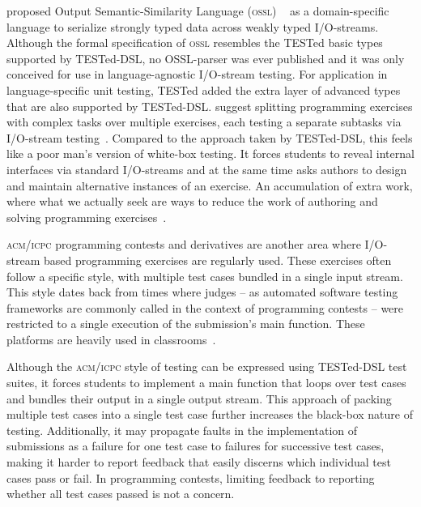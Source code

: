 \documentclass[../main]{subfiles}
\begin{document}
 proposed Output Semantic-Similarity Language (\textsc{ossl}) ~\autocite{fonteFlexibleDynamicSystem2013} as a domain-specific language to serialize strongly typed data across weakly typed I/O-streams.
Although the formal specification of \textsc{ossl} resembles the TESTed basic types supported by TESTed-DSL, no OSSL-parser was ever published and it was only conceived for use in language-agnostic I/O-stream testing.
For application in language-specific unit testing, TESTed added the extra layer of advanced types that are also supported by TESTed-DSL\@.
 suggest splitting programming exercises with complex tasks over multiple exercises, each testing a separate subtasks via I/O-stream testing~\autocite{enstromFiveYearsKattis2011}.
Compared to the approach taken by TESTed-DSL, this feels like a poor man's version of white-box testing.
It forces students to reveal internal interfaces via standard I/O-streams and at the same time asks authors to design and maintain alternative instances of an exercise.
An accumulation of extra work, where what we actually seek are ways to reduce the work of authoring and solving programming exercises~\autocite{douceAutomaticTestbasedAssessment2005}.

\textsc{acm/icpc} programming contests and derivatives are another area where I/O-stream based programming exercises are regularly used.
These exercises often follow a specific style, with multiple test cases bundled in a single input stream.
This style dates back from times where judges -- as automated software testing frameworks are commonly called in the context of programming contests -- were restricted to a single execution of the submission's main function.
These platforms are heavily used in classrooms~\autocite{wasikSurveyOnlineJudge2018,zinovievaUseOnlineCoding2021}.

Although the \textsc{acm/icpc} style of testing can be expressed using TESTed-DSL test suites, it forces students to implement a main function that loops over test cases and bundles their output in a single output stream.
This approach of packing multiple test cases into a single test case further increases the black-box nature of testing.
Additionally, it may propagate faults in the implementation of submissions as a failure for one test case to failures for successive test cases, making it harder to report feedback that easily discerns which individual test cases pass or fail.
In programming contests, limiting feedback to reporting whether all test cases passed is not a concern.
\end{document}
